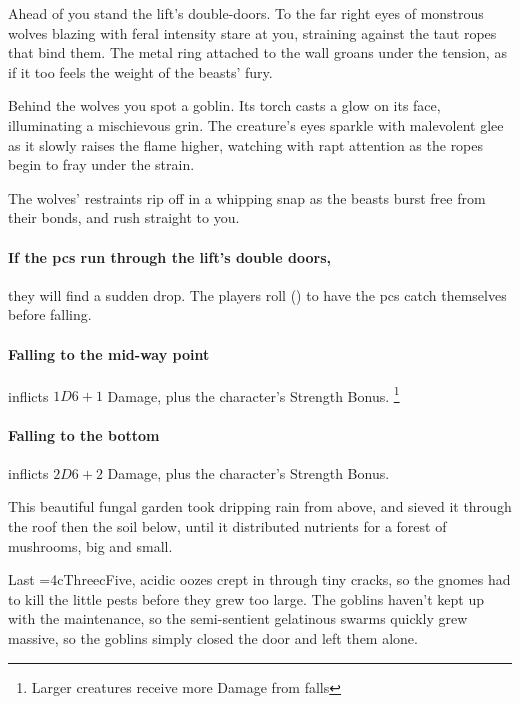 \begin{boxtext}
  Ahead of you stand the lift's double-doors.
  To the far right eyes of monstrous wolves blazing with feral intensity stare at you, straining against the taut ropes that bind them.
  The metal ring attached to the wall groans under the tension, as if it too feels the weight of the beasts' fury.

  Behind the wolves you spot a goblin.
  Its torch casts a glow on its face, illuminating a mischievous grin.
  The creature's eyes sparkle with malevolent glee as it slowly raises the flame higher, watching with rapt attention as the ropes begin to fray under the strain.

  The wolves' restraints rip off in a whipping snap as the beasts burst free from their bonds, and rush straight to you.
\end{boxtext}

\paragraph{If the \glspl{pc} run through the lift's double doors,}
they will find a sudden drop.
The players roll  (\tn[7]) to have the \glspl{pc} catch themselves before falling.

\paragraph{Falling to the mid-way point}
inflicts $1D6+1$ Damage, plus the character's Strength Bonus.%
\footnote{Larger creatures receive more Damage from falls}

\paragraph{Falling to the bottom}
inflicts $2D6+2$ Damage, plus the character's Strength Bonus.%



\begin{exampletext}
  This beautiful fungal garden took dripping rain from above, and sieved it through the roof then the soil below, until it distributed nutrients for a forest of mushrooms, big and small.

  Last \ifnum\value{cycle}=4\gls{cThree}\else\gls{cFive}\fi, acidic oozes crept in through tiny cracks, so the gnomes had to kill the little pests before they grew too large.
  The goblins haven't kept up with the maintenance, so the semi-sentient gelatinous \glspl{swarm} quickly grew massive, so the goblins simply closed the door and left them alone.
\end{exampletext}

